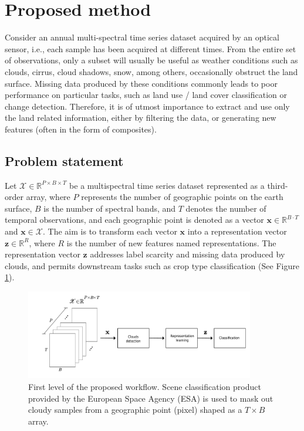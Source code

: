 \documentclass[journal,article,submit,pdftex,moreauthors]{Definitions/mdpi}
\begin{document}
\section{Proposed method}
Consider an annual multi-spectral time series dataset acquired by an optical sensor, i.e., each sample has been acquired at different times. From the entire set of observations, only a subset will usually be useful as weather conditions such as clouds, cirrus, cloud shadows, snow, among others, occasionally obstruct the land surface. 
Missing data produced by these conditions commonly leads to poor performance on particular tasks, such as land use / land cover classification or change detection.
Therefore, it is of utmost importance to extract and  use only the land related information, either by filtering the data, or generating new features (often in the form of composites).

\subsection{Problem statement}
Let $\mathscr{X} \in \mathbb{R}^{P \times B \times T}$ be a multispectral time series dataset represented as a third-order array, where $P$ represents the number of geographic points on the earth surface, $B$ is the number of spectral bands, and $T$ denotes the number of temporal observations, and each geographic point is denoted as a vector $\mathbf{x} \in \mathbb{R}^{B \cdot T}$ and $\mathbf{x} \in \mathscr{X}$. The aim is to transform each vector $\mathbf{x}$ into a representation vector $\mathbf{z} \in \mathbb{R}^{R}$, where $R$ is the number of new features named representations. The representation vector $\mathbf{z}$ addresses label scarcity and missing data produced by clouds, and permits downstream tasks such as crop type classification (See Figure \ref{bigpicture}).

\begin{figure}[H]
	\centering
	\includegraphics[width=10cm]{figures/bigpicture_with_clement.pdf}
	\caption{First level of the proposed workflow. Scene classification product provided by the European Space Agency (ESA) is used to mask out cloudy samples from a geographic point (pixel) shaped as a $T \times B$ array. 
    }
	\label{bigpicture}
	\centering
\end{figure}
\end{document}
